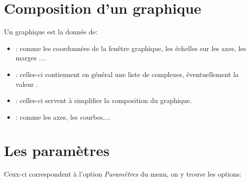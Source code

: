 \section{Composition d'un graphique}

Un graphique est la donnée de:

\begin{itemize}
\item {}: comme les coordonnées de la fenêtre graphique, les échelles sur les axes, les marges
....
\item {}: celles-ci contiennent en général une liste de complexes, éventuellement la
valeur \Nil.
\item {}: celles-ci servent à simplifier la composition du graphique.
\item {}: comme les axes, les courbes,...
\end{itemize}

\section{Les paramètres}\label{param}

Ceux-ci correspondent à l'option \textsl{Paramètres} du menu, on y trouve les options:

